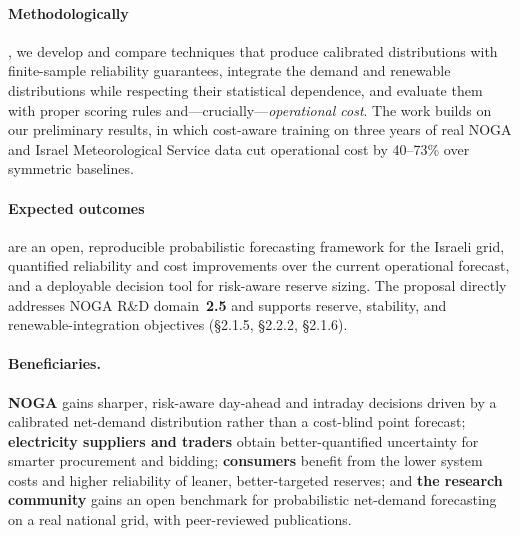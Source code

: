 \documentclass[12pt,a4paper]{article}
\begin{document}
\paragraph{Methodologically}, we develop and compare techniques that produce calibrated
distributions with finite-sample reliability guarantees, integrate the demand and renewable
distributions while respecting their statistical dependence, and evaluate them with proper
scoring rules and---crucially---\emph{operational cost}. The work builds on our preliminary
results, in which cost-aware training on three years of real NOGA and Israel Meteorological
Service data cut operational cost by 40--73\% over symmetric baselines.

\paragraph{Expected outcomes} are an open, reproducible probabilistic forecasting framework
for the Israeli grid, quantified reliability and cost improvements over the current
operational forecast, and a deployable decision tool for risk-aware reserve sizing. The
proposal directly addresses NOGA R\&D domain~\textbf{2.5} and supports reserve, stability,
and renewable-integration objectives (\S2.1.5, \S2.2.2, \S2.1.6).

\paragraph{Beneficiaries.} \textbf{NOGA} gains sharper, risk-aware day-ahead and intraday
decisions driven by a calibrated net-demand distribution rather than a cost-blind point
forecast; \textbf{electricity suppliers and traders} obtain better-quantified uncertainty
for smarter procurement and bidding; \textbf{consumers} benefit from the lower system costs
and higher reliability of leaner, better-targeted reserves; and \textbf{the research
community} gains an open benchmark for probabilistic net-demand forecasting on a real
national grid, with peer-reviewed publications.

\newpage

\tableofcontents
\newpage

\end{document}
